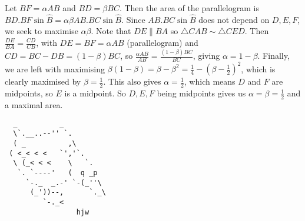\documentclass{article}
\begin{document}
\begin{enumerate}[1.]
Let $BF=\alpha AB$ and $BD=\beta BC$. Then the area of the parallelogram is $BD.BF\sin{\hat{B}} = \alpha \beta AB.BC\sin{\hat{B}}$. Since $AB.BC\sin{\hat{B}}$ does not depend on $D,E,F$, we seek to maximise $\alpha \beta$. Note that $DE\parallel BA$ so $\triangle CAB \sim \triangle CED$. Then $\frac{DE}{BA}=\frac{CD}{CB}$, with $DE=BF=\alpha AB$ (parallelogram) and $CD=BC-DB=(1-\beta)BC$, so $\frac{\alpha AB}{AB}=\frac{(1-\beta)BC}{BC}$, giving $\alpha = 1-\beta$. Finally, we are left with maximising $\beta (1-\beta) = \beta - \beta^2 = \frac{1}{4}-(\beta-\frac{1}{2})^2$, which is clearly maximised by $\beta=\frac{1}{2}$. This also gives $\alpha=\frac{1}{2}$, which means $D$ and $F$ are midpoints, so $E$ is a midpoint. So $D,E,F$ being midpoints gives us $\alpha=\beta=\frac{1}{2}$ and a maximal area.


\end{enumerate}

\vfill
\centering
\begin{BVerbatim}
  _          _
  \`.__..--'' `.
  ( _          ,\
 ( <_< < <   `','`.
  \ (_< < <    \   `.
   `. `----'   (  q _p
     `-._  _.-' `-(_''\
      (_'))--,      `._\
         `-._<
                 hjw
\end{BVerbatim}
\end{document}
